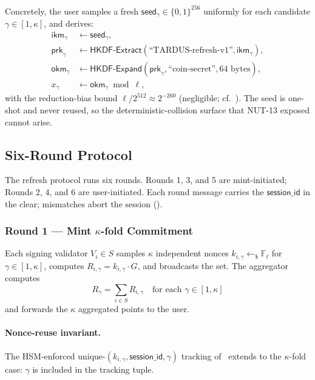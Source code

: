 Concretely, the user samples a fresh $\mathsf{seed}_\gamma \in \{0,1\}^{256}$ uniformly for each candidate $\gamma \in [1, \kappa]$, and derives:
\begin{align*}
  \mathsf{ikm}_\gamma   &\gets \mathsf{seed}_\gamma, \\
  \mathsf{prk}_\gamma   &\gets \mathsf{HKDF\text{-}Extract}(\text{``TARDUS-refresh-v1''}, \mathsf{ikm}_\gamma), \\
  \mathsf{okm}_\gamma   &\gets \mathsf{HKDF\text{-}Expand}(\mathsf{prk}_\gamma, \text{``coin-secret''}, 64\text{ bytes}), \\
  x_\gamma            &\gets \mathsf{okm}_\gamma \bmod \ell,
\end{align*}
with the reduction-bias bound $\ell / 2^{512} \approx 2^{-260}$ (negligible; cf.~). The seed is one-shot and never reused, so the deterministic-collision surface that NUT-13 exposed cannot arise.

\subsection{Six-Round Protocol}
\label{sec:refresh-rounds}

The refresh protocol runs six rounds. Rounds 1, 3, and 5 are mint-initiated; Rounds 2, 4, and 6 are user-initiated. Each round message carries the $\mathsf{session\_id}$ in the clear; mismatches abort the session ().

\subsubsection{Round 1 --- Mint \texorpdfstring{$\kappa$}{kappa}-fold Commitment}
\label{sec:refresh-r1}

Each signing validator $V_i \in S$ samples $\kappa$ independent nonces $k_{i,\gamma} \leftarrow_\$ \mathbb{F}_\ell$ for $\gamma \in [1, \kappa]$, computes $R_{i,\gamma} = k_{i,\gamma} \cdot G$, and broadcasts the set. The aggregator computes
\[
  R_\gamma = \sum_{i \in S} R_{i,\gamma} \quad \text{for each } \gamma \in [1, \kappa]
\]
and forwards the $\kappa$ aggregated points to the user.

\paragraph{Nonce-reuse invariant.} The HSM-enforced unique-$(k_{i,\gamma}, \mathsf{session\_id}, \gamma)$ tracking of~ extends to the $\kappa$-fold case: $\gamma$ is included in the tracking tuple.

